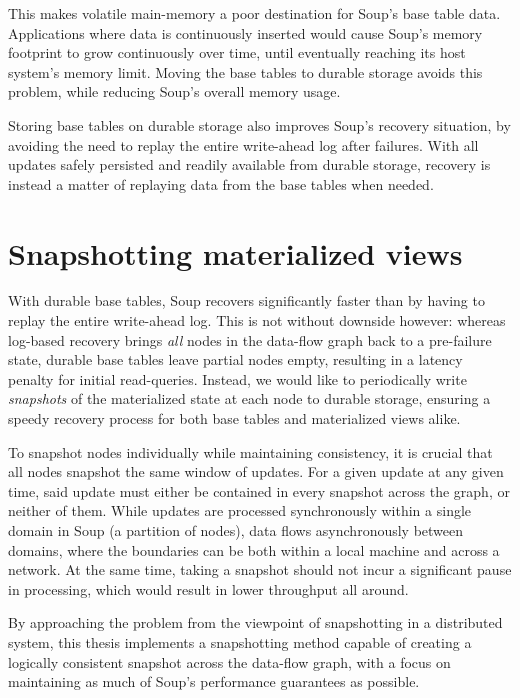 This makes volatile main-memory a poor destination for Soup's base table data.
Applications where data is continuously inserted would cause Soup's memory
footprint to grow continuously over time, until eventually reaching its host
system's memory limit. Moving the base tables to durable storage avoids this
problem, while reducing Soup's overall memory usage.

Storing base tables on durable storage also improves Soup's recovery situation,
by avoiding the need to replay the entire write-ahead log after failures. With
all updates safely persisted and readily available from durable storage,
recovery is instead a matter of replaying data from the base tables when needed.

\section{Snapshotting materialized views}

With durable base tables, Soup recovers significantly faster than by having to
replay the entire write-ahead log. This is not without downside however: whereas
log-based recovery brings \textit{all} nodes in the data-flow graph back to a
pre-failure state, durable base tables leave partial nodes empty, resulting in a
latency penalty for initial read-queries. Instead, we would like to periodically
write \textit{snapshots} of the materialized state at each node to durable
storage, ensuring a speedy recovery process for both base tables and
materialized views alike.

To snapshot nodes individually while maintaining consistency, it is crucial that
all nodes snapshot the same window of updates. For a given update at any given
time, said update must either be contained in every snapshot across the graph,
or neither of them. While updates are processed synchronously within a single
domain in Soup (a partition of nodes), data flows asynchronously between
domains, where the boundaries can be both within a local machine and across a
network. At the same time, taking a snapshot should not incur a significant
pause in processing, which would result in lower throughput all around.

By approaching the problem from the viewpoint of snapshotting in a distributed
system, this thesis implements a snapshotting method capable of creating a
logically consistent snapshot across the data-flow graph, with a focus on
maintaining as much of Soup's performance guarantees as possible.

